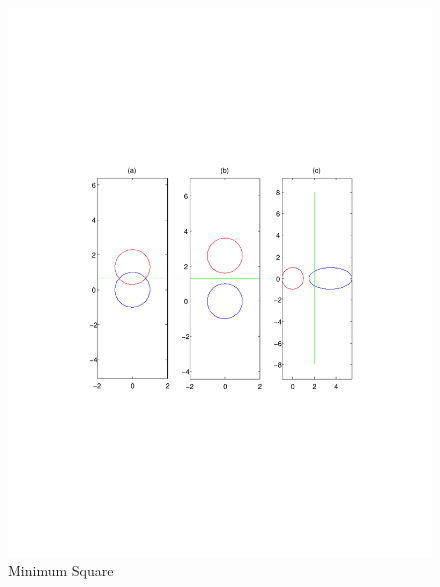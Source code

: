 \documentclass[a4paper,twoside=false,abstract=false,numbers=noenddot,
titlepage=false,headings=small,parskip=half,version=last]{scrartcl}
\theoremstyle{definition}
\theoremstyle{remark}
\begin{document}
\begin{figure}[t]
    \vspace{-270pt}
    \begin{center}
        \includegraphics[width=1.0\textwidth]{minimum_square_error.pdf}
    \end{center}
    \vspace{-170pt}
    \caption{Minimum Square}
    \label{fig:square}
\end{figure}
\end{document}
